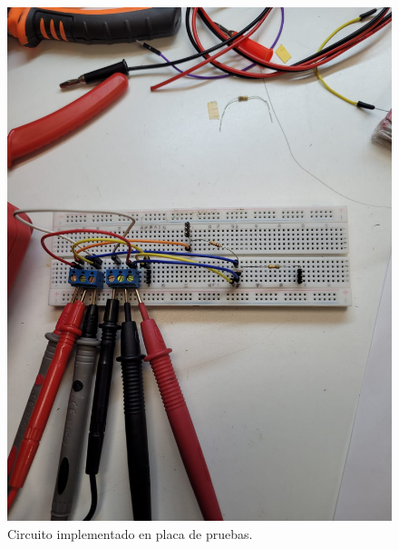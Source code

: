 \documentclass[chaptersright]{informeutn}
\begin{document}
        \begin{figure}[H]
        \begin{minipage}{0.40\textwidth}
          \centering
          \includegraphics[width=\textwidth]{pictures/disposicion-juntura-be.jpeg}
          \caption{Circuito implementado en placa de pruebas.}
          \label{fig:disposicion-juntura-be}
        \end{minipage}
        \begin{minipage}{0.40\textwidth}
          \centering

\end{minipage}
\end{figure}
\end{document}
